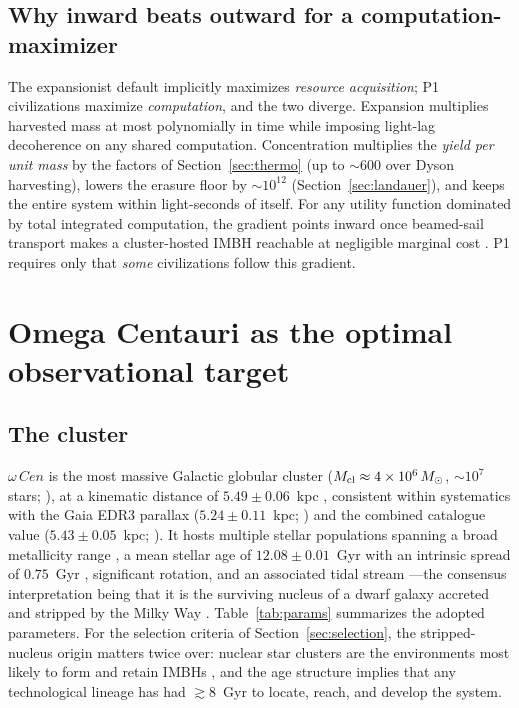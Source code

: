 \documentclass[11pt]{article}
\newcommand{\msun}{M_\odot}
\newcommand{\acen}{\ensuremath{\omega}\,Cen}
\begin{document}
\subsection{Why inward beats outward for a computation-maximizer}
The expansionist default implicitly maximizes \emph{resource acquisition}; P1 civilizations maximize \emph{computation}, and the two diverge. Expansion multiplies harvested mass at most polynomially in time while imposing light-lag decoherence on any shared computation. Concentration multiplies the \emph{yield per unit mass} by the factors of Section~\ref{sec:thermo} (up to ${\sim}600$ over Dyson harvesting), lowers the erasure floor by ${\sim}10^{12}$ (Section~\ref{sec:landauer}), and keeps the entire system within light-seconds of itself. For any utility function dominated by total integrated computation, the gradient points inward once beamed-sail transport makes a cluster-hosted IMBH reachable at negligible marginal cost \citep{lubin2016,armstrong2013}. P1 requires only that \emph{some} civilizations follow this gradient.

\section{Omega Centauri as the optimal observational target}\label{sec:omegacen}
\subsection{The cluster}
$\acen$ is the most massive Galactic globular cluster ($M_{\rm cl} \approx 4\times10^{6}\,\msun$, ${\sim}10^{7}$ stars; \citealp{baumgardt2018}), at a kinematic distance of $5.49 \pm 0.06$~kpc \citep{haberle2025}, consistent within systematics with the Gaia EDR3 parallax ($5.24 \pm 0.11$~kpc; \citealp{soltis2021}) and the combined catalogue value ($5.43 \pm 0.05$~kpc; \citealp{baumgardt2021}). It hosts multiple stellar populations spanning a broad metallicity range \citep{johnson2010}, a mean stellar age of $12.08 \pm 0.01$~Gyr with an intrinsic spread of $0.75$~Gyr \citep{clontz2024}, significant rotation, and an associated tidal stream \citep{ibata2019}---the consensus interpretation being that it is the surviving nucleus of a dwarf galaxy accreted and stripped by the Milky Way \citep{hilker2000,bekki2019}. Table~\ref{tab:params} summarizes the adopted parameters. For the selection criteria of Section~\ref{sec:selection}, the stripped-nucleus origin matters twice over: nuclear star clusters are the environments most likely to form and retain IMBHs \citep{greene2020}, and the age structure implies that any technological lineage has had $\gtrsim 8$~Gyr to locate, reach, and develop the system.
\end{document}
